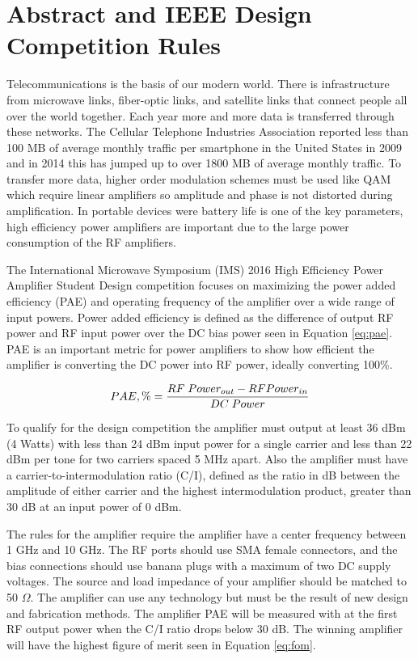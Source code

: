 \chapter{Abstract and IEEE Design Competition Rules}
Telecommunications is the basis of our modern world. There is infrastructure from microwave links, fiber-optic links, and satellite links that connect people all over the world together. Each year more and more data is transferred through these networks. The Cellular Telephone Industries Association reported less than 100 MB of average monthly traffic per smartphone in the United States in 2009 and in 2014 this has jumped up to over 1800 MB of average monthly traffic. To transfer more data, higher order modulation schemes must be used like QAM which require linear amplifiers so amplitude and phase is not distorted during amplification. In portable devices were battery life is one of the key parameters, high efficiency power amplifiers are important due to the large power consumption of the RF amplifiers.

 The International Microwave Symposium (IMS) 2016 High Efficiency Power Amplifier Student Design competition focuses on maximizing the power added efficiency (PAE) and operating frequency of the amplifier over a wide range of input powers. Power added efficiency is defined as the difference of output RF power and RF input power over the DC bias power seen in Equation \ref{eq:pae}. PAE is an important metric for power amplifiers to show how efficient the amplifier is converting the DC power into RF power, ideally converting 100\%.

\begin{equation}\label{eq:pae}
  PAE,\% = \frac{RF\;Power_{out} - RF\\Power_{in}}{DC\;Power}
\end{equation}

To qualify for the design competition the amplifier must output at least 36 dBm (4 Watts) with less than 24 dBm input power for a single carrier and less than 22 dBm per tone for two carriers spaced 5 MHz apart. Also the amplifier must have a carrier-to-intermodulation ratio (C/I), defined as the ratio in dB between the amplitude of either carrier and the highest intermodulation product, greater than 30 dB at an input power of 0 dBm.

The rules for the amplifier require the amplifier have a center frequency between 1 GHz and 10 GHz. The RF ports should use SMA female connectors, and the bias connections should use banana plugs with a maximum of two DC supply voltages. The source and load impedance of your amplifier should be matched to 50 $\Omega$. The amplifier can use any technology but must be the result of new design and fabrication methods. The amplifier PAE will be measured with at the first RF output power when the C/I ratio drops below 30 dB. The winning amplifier will have the highest figure of merit seen in Equation \ref{eq:fom}. 

